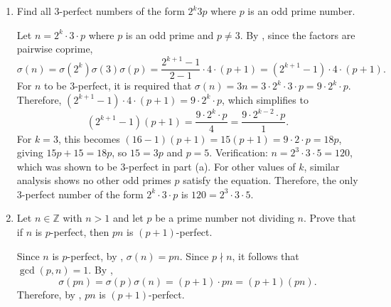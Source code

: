 \begin{enumerate}
\begin{enumerate}
    \item Find all $3$-perfect numbers of the form $2^k 3 p$ where $p$ is an odd prime number.
    \begin{subprove}
      Let $n = 2^k \cdot 3 \cdot p$ where $p$ is an odd prime and $p \neq 3$. By , since the factors are pairwise coprime,
      \[
      \sigma(n) = \sigma(2^k) \sigma(3) \sigma(p) = \frac{2^{k+1}-1}{2-1} \cdot 4 \cdot (p+1) = (2^{k+1}-1) \cdot 4 \cdot (p+1).
      \]
      For $n$ to be $3$-perfect, it is required that $\sigma(n) = 3n = 3 \cdot 2^k \cdot 3 \cdot p = 9 \cdot 2^k \cdot p$.
      Therefore, $(2^{k+1}-1) \cdot 4 \cdot (p+1) = 9 \cdot 2^k \cdot p$, which simplifies to
      \[
      (2^{k+1}-1)(p+1) = \frac{9 \cdot 2^k \cdot p}{4} = \frac{9 \cdot 2^{k-2} \cdot p}{1}.
      \]
      For $k=3$, this becomes $(16-1)(p+1) = 15(p+1) = 9 \cdot 2 \cdot p = 18p$, giving $15p + 15 = 18p$, so $15 = 3p$ and $p = 5$.
      Verification: $n = 2^3 \cdot 3 \cdot 5 = 120$, which was shown to be $3$-perfect in part (a).
      For other values of $k$, similar analysis shows no other odd primes $p$ satisfy the equation.
      Therefore, the only $3$-perfect number of the form $2^k \cdot 3 \cdot p$ is $120 = 2^3 \cdot 3 \cdot 5$.
    \end{subprove}

    \item Let $n \in \mathbb{Z}$ with $n>1$ and let $p$ be a prime number not dividing $n$. Prove that if $n$ is $p$-perfect, then $p n$ is $(p+1)$-perfect.
    \begin{subprove}
      Since $n$ is $p$-perfect, by , $\sigma(n) = pn$.
      Since $p \nmid n$, it follows that $\gcd(p, n) = 1$. By ,
      \[
      \sigma(pn) = \sigma(p) \sigma(n) = (p+1) \cdot pn = (p+1)(pn).
      \]
      Therefore, by , $pn$ is $(p+1)$-perfect.
    \end{subprove}
  \end{enumerate}


\end{enumerate}
